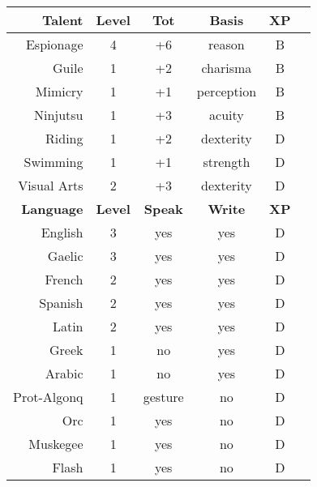 \documentclass[11pt]{article}
\newcommand{\heading}[1]{{\sc\bfseries #1}}
\begin{document}
%
\ \ \ \ \
%
\begin{tabular}[t]{|r|c|c|c|c|c|}
\hline
%
\heading{Talent} & \heading{Level} & \heading{Tot} & \heading{Basis} & \heading{XP}
\\ \hline \hline
\sc Espionage & 4 & +6 & reason & B
\\
\sc Guile & 1 & +2 & charisma & B
\\
\sc Mimicry & 1 & +1 & perception & B
\\
\sc Ninjutsu & 1 & +3 & acuity & B
\\
\sc Riding & 1 & +2 & dexterity & D
\\
\sc Swimming & 1 & +1 & strength & D
\\
\sc Visual Arts & 2 & +3 & dexterity & D
%
\\[12pt] \hline \hline
%
\heading{Language} & \heading{Level} & \heading{Speak} & \heading{Write} & \heading{XP}
\\ \hline \hline
\sc English & 3 & yes & yes & D
\\
\sc Gaelic & 3 & yes & yes & D
\\
\sc French & 2 & yes & yes & D
\\
\sc Spanish & 2 & yes & yes & D
\\
\sc Latin & 2 & yes & yes & D
\\
\sc Greek & 1 & no & yes & D
\\
\sc Arabic & 1 & no & yes & D
\\
\sc Prot-Algonq & 1 & gesture & no & D
\\
\sc Orc & 1 & yes & no & D
\\
\sc Muskegee & 1 & yes & no & D
\\
\sc Flash & 1 & yes & no & D
\\ \hline
\end{tabular}
\end{document}
